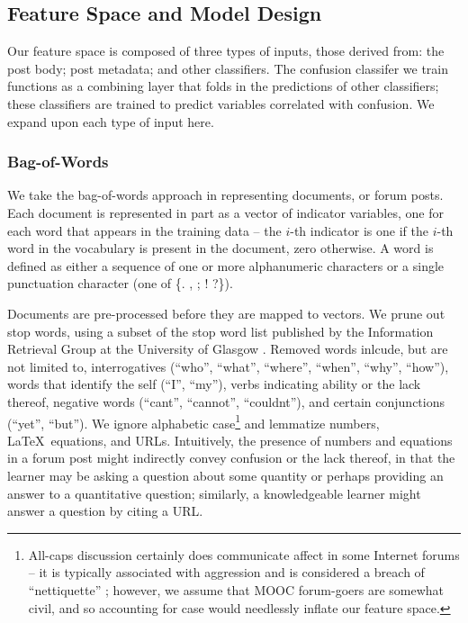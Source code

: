 \documentclass{edm_template}
\begin{document}
\subsection{Feature Space and Model Design}
Our feature space is composed of three types of inputs, those derived from: the post body; post metadata; and other classifiers. The confusion classifer we train functions as a combining layer that folds in the predictions of other classifiers; these classifiers are trained to predict variables correlated with confusion. We expand upon each type of input here.

\subsubsection{Bag-of-Words}
We take the bag-of-words approach in representing documents, or forum posts. Each document is represented in part as a vector of indicator variables, one for each word that appears in the training data -- the $i$-th indicator is one if the $i$-th word in the vocabulary is present in the document, zero otherwise. A word is defined as either a sequence of one or more alphanumeric characters or a single punctuation character (one of \{. , ; ! ?\}).

Documents are pre-processed before they are mapped to vectors. We prune out stop words, using a subset of the stop word list published by the Information Retrieval Group at the University of Glasgow \cite{glasgow}. Removed words inlcude, but are not limited to, interrogatives (``who'', ``what'', ``where'', ``when'', ``why'', ``how''), words that identify the self (``I'', ``my''), verbs indicating ability or the lack thereof, negative words (``cant'', ``cannot'', ``couldnt''), and certain conjunctions (``yet'', ``but''). We ignore alphabetic case\footnote{All-caps discussion certainly does communicate affect in some Internet forums -- it is typically associated with aggression and is considered a breach of ``nettiquette'' \cite{hambridge1995netiquette}; however, we assume that MOOC forum-goers are somewhat civil, and so accounting for case would needlessly inflate our feature space.} and lemmatize numbers, \LaTeX\ equations, and URLs. Intuitively, the presence of numbers and equations in a forum post might indirectly convey confusion or the lack thereof, in that the learner may be asking a question about some quantity or perhaps providing an answer to a quantitative question; similarly, a knowledgeable learner might answer a question by citing a URL. 
\end{document}
